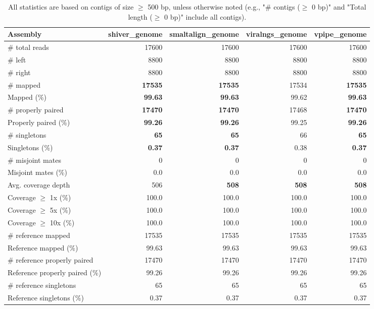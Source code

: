 \documentclass[12pt,a4paper]{article}
\begin{document}
\begin{table}[ht]
\begin{center}
\caption{All statistics are based on contigs of size $\geq$ 500 bp, unless otherwise noted (e.g., "\# contigs ($\geq$ 0 bp)" and "Total length ($\geq$ 0 bp)" include all contigs).}
\begin{tabular}{|l*{4}{|r}|}
\hline
Assembly & shiver\_genome & smaltalign\_genome & viralngs\_genome & vpipe\_genome \\ \hline
\# total reads & 17600 & 17600 & 17600 & 17600 \\ \hline
\# left & 8800 & 8800 & 8800 & 8800 \\ \hline
\# right & 8800 & 8800 & 8800 & 8800 \\ \hline
\# mapped & {\bf 17535} & {\bf 17535} & 17534 & {\bf 17535} \\ \hline
Mapped (\%) & {\bf 99.63} & {\bf 99.63} & 99.62 & {\bf 99.63} \\ \hline
\# properly paired & {\bf 17470} & {\bf 17470} & 17468 & {\bf 17470} \\ \hline
Properly paired (\%) & {\bf 99.26} & {\bf 99.26} & 99.25 & {\bf 99.26} \\ \hline
\# singletons & {\bf 65} & {\bf 65} & 66 & {\bf 65} \\ \hline
Singletons (\%) & {\bf 0.37} & {\bf 0.37} & 0.38 & {\bf 0.37} \\ \hline
\# misjoint mates & 0 & 0 & 0 & 0 \\ \hline
Misjoint mates (\%) & 0.0 & 0.0 & 0.0 & 0.0 \\ \hline
Avg. coverage depth & 506 & {\bf 508} & {\bf 508} & {\bf 508} \\ \hline
Coverage $\geq$ 1x (\%) & 100.0 & 100.0 & 100.0 & 100.0 \\ \hline
Coverage $\geq$ 5x (\%) & 100.0 & 100.0 & 100.0 & 100.0 \\ \hline
Coverage $\geq$ 10x (\%) & 100.0 & 100.0 & 100.0 & 100.0 \\ \hline
\# reference mapped & 17535 & 17535 & 17535 & 17535 \\ \hline
Reference mapped (\%) & 99.63 & 99.63 & 99.63 & 99.63 \\ \hline
\# reference properly paired & 17470 & 17470 & 17470 & 17470 \\ \hline
Reference properly paired (\%) & 99.26 & 99.26 & 99.26 & 99.26 \\ \hline
\# reference singletons & 65 & 65 & 65 & 65 \\ \hline
Reference singletons (\%) & 0.37 & 0.37 & 0.37 & 0.37 \\ \hline

\end{tabular}
\end{center}
\end{table}
\end{document}
